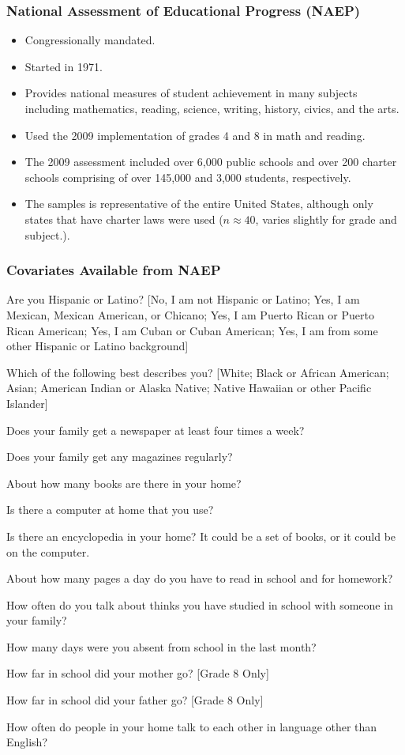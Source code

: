 \documentclass[10pt,handout,mathserif]{beamer}
\begin{document}
\begin{frame}[c]
	\frametitle{National Assessment of Educational Progress (NAEP)}
	\begin{itemize}
    \setlength{\itemsep}{15pt}
	\item Congressionally mandated.
	\item Started in 1971.
	\item Provides national measures of student achievement in many subjects including mathematics, reading, science, writing, history, civics, and the arts.
	    \item Used the 2009 implementation of grades 4 and 8 in math and reading.
	\item The 2009 assessment included over 6,000 public schools and over 200 charter schools comprising of over 145,000 and 3,000 students, respectively. 
	    \item The samples is representative of the entire United States, although only states that have charter laws were used ($n \approx 40$, varies slightly for grade and subject.).
	\end{itemize}

\end{frame}

\begin{frame}
	\frametitle{Covariates Available from NAEP}
	\begin{enumerate}\small{
	\item Are you Hispanic or Latino? [No, I am not Hispanic or Latino; Yes, I am Mexican, Mexican American, or Chicano; Yes, I am Puerto Rican or Puerto Rican American; Yes, I am Cuban or Cuban American; Yes, I am from some other Hispanic or Latino background]
	\item Which of the following best describes you? [White; Black or African American; Asian; American Indian or Alaska Native; Native Hawaiian or other Pacific Islander]
	\item Does your family get a newspaper at least four times a week?
	\item Does your family get any magazines regularly?
	\item About how many books are there in your home?
	\item Is there a computer at home that you use?
	\item Is there an encyclopedia in your home? It could be a set of books, or it could be on the computer.
	\item About how many pages a day do you have to read in school and for homework?
	\item How often do you talk about thinks you have studied in school with someone in your family?
	\item How many days were you absent from school in the last month?
	\item How far in school did your mother go? [Grade 8 Only]
	\item How far in school did your father go? [Grade 8 Only]
	\item How often do people in your home talk to each other in language other than English?
	}
\end{enumerate}
\end{frame}
\end{document}
